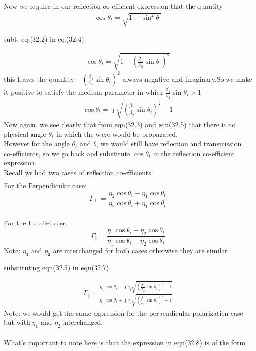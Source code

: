 Now we require in our reflection co-efficient expression that the quantity
\begin{align}
\cos\theta_t = \sqrt{1-\sin^2\theta_t}
\end{align}
\begin{center}
subt. eq.(32.2) in eq.(32.4)
\end{center}
\begin{align*}
\cos\theta_t = \sqrt{1-(\frac{\beta_1}{\beta_2}\sin\theta_i)^2}
\end{align*}
this leaves the quantity $-(\frac{\beta_1}{\beta_2}\sin\theta_i)^2$ always negative and imaginary.So we make it positive to satisfy the medium parameter in which $\frac{\beta_1}{\beta_2}\sin\theta_i > 1$
\begin{align}
\cos\theta_t = \jmath\sqrt{(\frac{\beta_1}{\beta_2}\sin\theta_i)^2-1}
\end{align}
Now again, we see clearly that from eqn(32.3) and eqn(32.5) 
that there is no physical angle $\theta_t$ in which the wave would be propagated.\\
However for the angle $\theta_t$ and $\theta_i$ we would still have reflection and transmission co-efficients, so we go back and substitute $\cos\theta_t$ in the reflection co-efficient expression.\\
Recall we had two cases of reflection co-efficients.
\begin{align*}
\end{align*}For the Perpendicular case:
\begin{equation}
\Gamma_\perp\ = \frac{\eta_2\cos\theta_i - \eta_1\cos\theta_t}{\eta_2\cos\theta_i + \eta_1\cos\theta_t}
\end{equation}\\
For the Parallel case:
\begin{equation}
\Gamma_\parallel = \frac{\eta_1\cos\theta_i - \eta_2\cos\theta_t}{\eta_1\cos\theta_i + \eta_2\cos\theta_t}
\end{equation}
Note: $\eta_1$ and $\eta_2$ are interchanged for both cases otherwise they are similar. \\
\begin{center}
	substituting eqn(32.5) in eqn(32.7)
\end{center}
\begin{align}
\Gamma_\parallel = \frac{\eta_1\cos\theta_i - \jmath\eta_2\sqrt{(\frac{\beta_1}{\beta_2}\sin\theta_i)^2-1}}{\eta_1\cos\theta_i + \jmath\eta_2\sqrt{(\frac{\beta_1}{\beta_2}\sin\theta_i)^2-1}}
\end{align}
Note: we would get the same expression for the perpendicular polarization case but with $\eta_1$ and $\eta_2$ interchanged.\\ \\
What's important to note here is that the expression in eqn(32.8) is of the form


